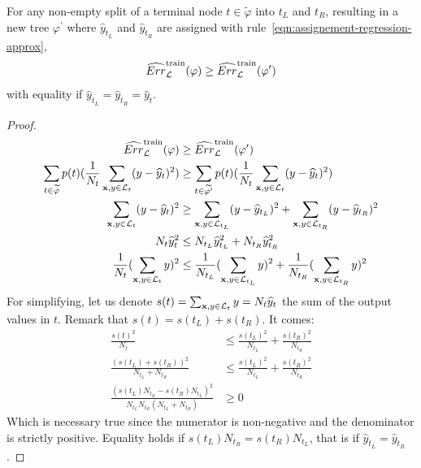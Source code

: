 \begin{proposition}\label{prop:any-split-reduce-regression}
For any non-empty split of a terminal node $t \in \widetilde{\varphi}$ into $t_L$ and
$t_R$, resulting in a new tree $\varphi^\prime$ where $\widehat{y}_{t_L}$ and $\widehat{y}_{t_R}$
are assigned with rule~\ref{eqn:assignement-regression-approx}, $$\widehat{Err}_{\cal
L}^\text{train}(\varphi) \geq \widehat{Err}_{\cal
L}^\text{train}(\varphi^\prime)$$ with equality if $\widehat{y}_{t_L} = \widehat{y}_{t_R} = \widehat{y}_t$.
\end{proposition}

\begin{proof}
\begin{align*}
\widehat{Err}_{\cal L}^\text{train}(\varphi) &\geq \widehat{Err}_{\cal L}^\text{train}(\varphi^\prime)  \\
\sum_{t \in \widetilde{\varphi}} p(t) (\frac{1}{N_t} \sum_{\mathbf{x}, y \in {\cal L}_t} (y - \widehat{y}_t)^2) &\geq \sum_{t \in \widetilde{\varphi^\prime}} p(t) (\frac{1}{N_t} \sum_{\mathbf{x}, y \in {\cal L}_t} (y - \widehat{y}_t)^2) \\
\sum_{\mathbf{x}, y \in {\cal L}_t} (y - \widehat{y}_t)^2 &\geq \sum_{\mathbf{x}, y \in {\cal L}_{t_L}} (y - \widehat{y}_{t_L})^2 + \sum_{\mathbf{x}, y \in {\cal L}_{t_R}} (y - \widehat{y}_{t_R})^2 \\
N_t \widehat{y}_t^2 &\leq N_{t_L} \widehat{y}_{t_L}^2 + N_{t_R} \widehat{y}_{t_R}^2 \\
\frac{1}{N_t} (\sum_{\mathbf{x}, y \in {\cal L}_{t}} y)^2 &\leq \frac{1}{N_{t_L}} (\sum_{\mathbf{x}, y \in {\cal L}_{t_L}} y)^2 + \frac{1}{N_{t_R}} (\sum_{\mathbf{x}, y \in {\cal L}_{t_R}} y)^2
\end{align*}
For simplifying, let us denote $s(t) = \sum_{\mathbf{x}, y \in {\cal L}_{t}} y = N_t \widehat{y}_t$
the sum of the output values in $t$. Remark that $s(t) = s(t_L) + s(t_R)$. It comes:
\begin{align*}
\frac{s(t)^2}{N_t} &\leq \frac{s(t_L)^2}{N_{t_L}} + \frac{s(t_R)^2}{N_{t_R}} \\
\frac{(s(t_L) + s(t_R))^2}{N_{t_L} + N_{t_R}} &\leq \frac{s(t_L)^2}{N_{t_L}} + \frac{s(t_R)^2}{N_{t_R}} \\
\frac{(s(t_L) N_{t_R} - s(t_R) N_{t_L})^2}{N_{t_L} N_{t_R} (N_{t_L} + N_{t_R})} &\geq 0
\end{align*}
Which is necessary true since the numerator is non-negative and the denominator is
strictly positive. Equality holds if $s(t_L) N_{t_R} = s(t_R) N_{t_L}$, that is if $\widehat{y}_{t_L} = \widehat{y}_{t_R}$.
\end{proof}

